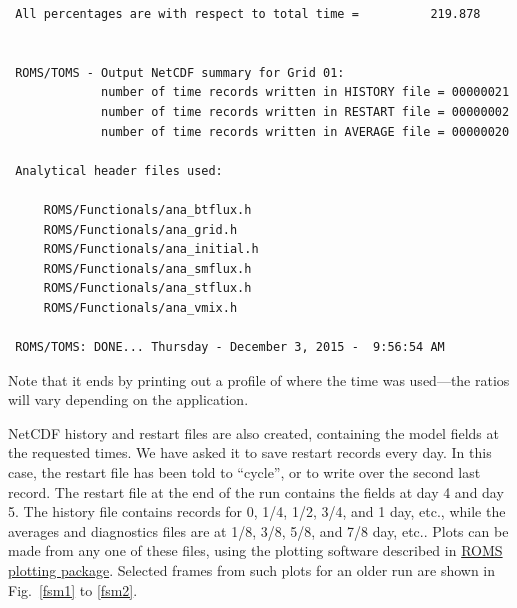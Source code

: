 \begin{verbatim}
 All percentages are with respect to total time =          219.878


 ROMS/TOMS - Output NetCDF summary for Grid 01:
             number of time records written in HISTORY file = 00000021
             number of time records written in RESTART file = 00000002
             number of time records written in AVERAGE file = 00000020

 Analytical header files used:

     ROMS/Functionals/ana_btflux.h
     ROMS/Functionals/ana_grid.h
     ROMS/Functionals/ana_initial.h
     ROMS/Functionals/ana_smflux.h
     ROMS/Functionals/ana_stflux.h
     ROMS/Functionals/ana_vmix.h

 ROMS/TOMS: DONE... Thursday - December 3, 2015 -  9:56:54 AM
\end{verbatim}
Note that it ends by printing out a profile of where the time was
used---the ratios will vary depending on the application.

NetCDF history and restart files are also created, containing
the model fields at the requested times. We have asked it to save 
restart records every day. In this case, the restart
file has been told to ``cycle'', or to write over the second last
record. The restart file at the end of the run contains the fields at
day 4 and day 5. The history file contains records for 0, 1/4, 1/2,
3/4, and 1 day, etc., while the averages and diagnostics files are
at 1/8, 3/8, 5/8, and 7/8 day, etc..
Plots can be made from any one of these files, using the plotting
software described in
\href{https://www.myroms.org/wiki/index.php/Plotting_Package_Installation}{ROMS
plotting package}. Selected frames from
such plots for an older run are shown in Fig.\ \ref{fsm1} to \ref{fsm2}.

